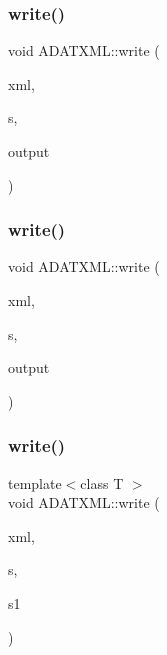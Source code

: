 \mbox{\label{group__io_gae1439bc15e3d4497d18ecc77d6443d3b}} 
\subsubsection{\texorpdfstring{write()}{write()}\hspace{0.1cm}{\footnotesize\ttfamily [13/58]}}
{\footnotesize\ttfamily void A\+D\+A\+T\+X\+M\+L\+::write (\begin{DoxyParamCaption}\item[{\mbox{\hyperlink{classADATXML_1_1XMLWriter}{X\+M\+L\+Writer}} \&}]{xml,  }\item[{const std\+::string \&}]{s,  }\item[{const double \&}]{output }\end{DoxyParamCaption})}

\mbox{\label{group__io_gaa6f01baa873f2c676d573b16ff3a1099}} 
\subsubsection{\texorpdfstring{write()}{write()}\hspace{0.1cm}{\footnotesize\ttfamily [14/58]}}
{\footnotesize\ttfamily void A\+D\+A\+T\+X\+M\+L\+::write (\begin{DoxyParamCaption}\item[{\mbox{\hyperlink{classADATXML_1_1XMLWriter}{X\+M\+L\+Writer}} \&}]{xml,  }\item[{const std\+::string \&}]{s,  }\item[{const bool \&}]{output }\end{DoxyParamCaption})}

\mbox{\label{group__io_ga505002df14eea0ecd6a4c92bfdc6425d}} 
\subsubsection{\texorpdfstring{write()}{write()}\hspace{0.1cm}{\footnotesize\ttfamily [15/58]}}
{\footnotesize\ttfamily template$<$class T $>$ \\
void A\+D\+A\+T\+X\+M\+L\+::write (\begin{DoxyParamCaption}\item[{\mbox{\hyperlink{classADATXML_1_1XMLWriter}{X\+M\+L\+Writer}} \&}]{xml,  }\item[{const std\+::string \&}]{s,  }\item[{const \mbox{\hyperlink{classXMLArray_1_1Array}{X\+M\+L\+Array\+::\+Array}}$<$ T $>$ \&}]{s1 }\end{DoxyParamCaption})\hspace{0.3cm}{\ttfamily [inline]}}



